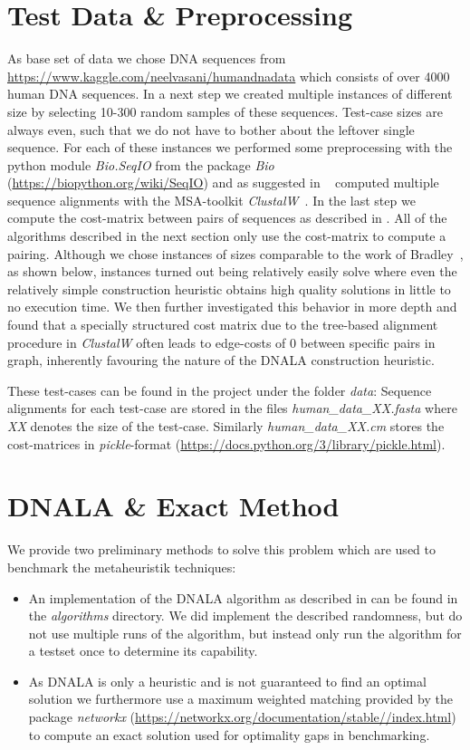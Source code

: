 \documentclass[12pt]{article}
\begin{document}
\section{Test Data \& Preprocessing}
\label{sec:test-data}
As base set of data we chose DNA sequences from \url{https://www.kaggle.com/neelvasani/humandnadata} which consists of over 4000 human DNA sequences.
In a next step we created multiple instances of different size by selecting 10-300 random samples of these sequences.
Test-case sizes are always even, such that we do not have to bother about the leftover single sequence.
For each of these instances we performed some preprocessing with the python module \textit{Bio.SeqIO} from the package \textit{Bio} (\url{https://biopython.org/wiki/SeqIO}) and as suggested in ~\cite{mainpaper} computed  multiple sequence alignments with the MSA-toolkit \emph{ClustalW}~\cite{clustalw}. In the last step we compute the cost-matrix between pairs of sequences as described in \cite{mainpaper}.
All of the algorithms described in the next section only use the cost-matrix to compute a pairing.
Although we chose instances of sizes comparable to the work of Bradley~\cite{mainpaper}, as shown below, instances turned out being relatively easily solve where even the relatively simple construction heuristic obtains high quality solutions in little to no execution time. We then further investigated this behavior in more depth and found that a specially structured cost matrix due to the tree-based alignment procedure in \emph{ClustalW} often leads to edge-costs of $0$ between specific pairs in graph, inherently favouring the nature of the DNALA construction heuristic. 

These test-cases can be found in the project under the folder \textit{data}:
Sequence alignments for each test-case are stored in the files \textit{human\_data\_XX.fasta} where \textit{XX} denotes the size of the test-case.
Similarly \textit{human\_data\_XX.cm} stores the cost-matrices in \textit{pickle}-format (\url{https://docs.python.org/3/library/pickle.html}).

\section{DNALA \& Exact Method}
We provide two preliminary methods to solve this problem which are used to benchmark the metaheuristik techniques:
\begin{itemize}
    \item An implementation of the DNALA algorithm as described in \cite{mainpaper} can be found in the \textit{algorithms} directory.
    We did implement the described randomness, but do not use multiple runs of the algorithm, but instead only run the algorithm for a testset once to determine its capability.

    \item As DNALA is only a heuristic and is not guaranteed to find an optimal solution we furthermore use a maximum weighted matching provided by the package \textit{networkx} (\url{https://networkx.org/documentation/stable//index.html}) to compute an exact solution used for optimality gaps in benchmarking.
\end{itemize}
\end{document}
